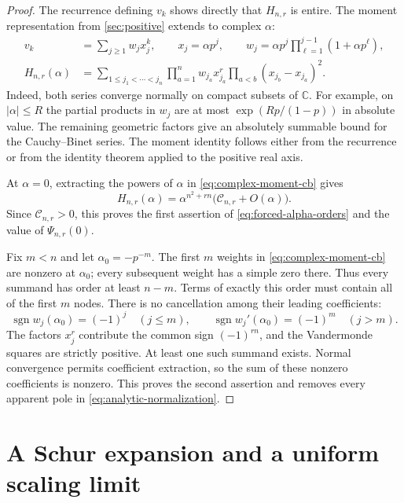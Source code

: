 \documentclass[11pt]{article}
\numberwithin{equation}{section}
\theoremstyle{definition}
\theoremstyle{remark}
\newcommand{\C}{\mathbb{C}}
\begin{document}
\begin{proof}
The recurrence defining $v_k$ shows directly that $H_{n,r}$ is entire.
The moment representation from \cref{sec:positive} extends to complex
$\alpha$:
\begin{equation}\label{eq:complex-moment-cb}
 \begin{split}
 v_k&=\sum_{j\ge1}w_jx_j^k,\qquad
 x_j=\alpha p^j,\qquad
 w_j=\alpha p^j\prod_{\ell=1}^{j-1}(1+\alpha p^\ell),\\
 H_{n,r}(\alpha)
 &=\sum_{1\le j_1<\cdots<j_n}
 \prod_{a=1}^n w_{j_a}x_{j_a}^{r}
 \prod_{a<b}(x_{j_b}-x_{j_a})^2.
 \end{split}
\end{equation}
Indeed, both series converge normally on compact subsets of $\C$.
For example, on $|\alpha|\le R$ the partial products in $w_j$ are at
most $\exp(Rp/(1-p))$ in absolute value. The remaining geometric factors
give an absolutely summable bound for the Cauchy--Binet series.
The moment identity follows either from the recurrence or from the
identity theorem applied to the positive real axis.

At $\alpha=0$, extracting the powers of $\alpha$ in
\eqref{eq:complex-moment-cb} gives
\[
 H_{n,r}(\alpha)
 =\alpha^{n^2+rn}\bigl(\mathcal C_{n,r}+O(\alpha)\bigr).
\]
Since $\mathcal C_{n,r}>0$, this proves the first assertion of
\eqref{eq:forced-alpha-orders} and the value of $\Psi_{n,r}(0)$.

Fix $m<n$ and let $\alpha_0=-p^{-m}$. The first $m$ weights in
\eqref{eq:complex-moment-cb} are nonzero at $\alpha_0$; every subsequent
weight has a simple zero there. Thus every summand has order at least
$n-m$. Terms of exactly this order must contain all of the first $m$
nodes. There is no cancellation among their leading coefficients:
\[
 \operatorname{sgn}w_j(\alpha_0)=(-1)^j\quad(j\le m),\qquad
 \operatorname{sgn}w_j'(\alpha_0)=(-1)^m\quad(j>m).
\]
The factors $x_j^r$ contribute the common sign $(-1)^{rn}$, and the
Vandermonde squares are strictly positive. At least one such summand
exists. Normal convergence permits coefficient extraction, so the sum
of these nonzero coefficients is nonzero. This proves the second
assertion and removes every apparent pole in
\eqref{eq:analytic-normalization}.
\end{proof}

\section{A Schur expansion and a uniform scaling limit}
\label{sec:schur-edge-limit}
\end{document}
